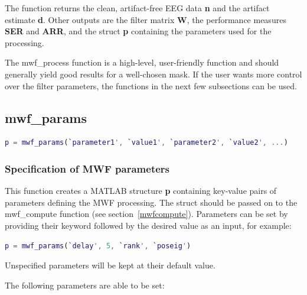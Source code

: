 \documentclass[11pt]{article}
\begin{document}
The function returns the clean, artifact-free EEG data \textbf{n} and the artifact estimate \textbf{d}. Other outputs are the filter matrix \textbf{W}, the performance measures \textbf{SER} and \textbf{ARR}, and the struct \textbf{p} containing the parameters used for the processing.

The mwf\_process function is a high-level, user-friendly function and should generally yield good results for a well-chosen mask. If the user wants more control over the filter parameters, the functions in the next few subsections can be used.

\newpage
\subsection{mwf\_params}
\label{mwfparams}

\begin{lstlisting}[frame=single, language=matlab]
p = mwf_params(`parameter1', `value1', `parameter2', `value2', ...)
\end{lstlisting}

\subsubsection{Specification of MWF parameters}

This function creates a MATLAB structure \textbf{p} containing key-value pairs of parameters defining the MWF processing. The struct should be passed on to the mwf\_compute function (see section~\ref{mwfcompute}). Parameters can be set by providing their keyword followed by the desired value as an input, for example:
%
\begin{lstlisting}[frame=single, language=matlab]
p = mwf_params(`delay', 5, `rank', `poseig')
\end{lstlisting}
%
Unspecified parameters will be kept at their default value.

The following parameters are able to be set:
\end{document}
